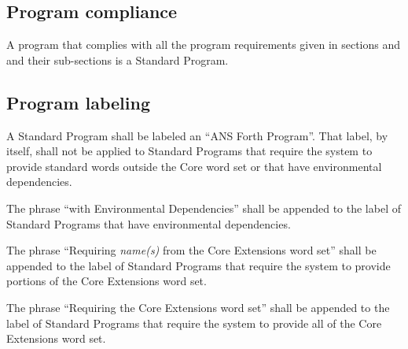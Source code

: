 \subsection{Program compliance} %

A program that complies with all the program requirements given in
sections  and
 and their sub-sections is
a Standard Program.

\subsection{Program labeling} %

A Standard Program shall be labeled an ``ANS Forth Program''. That
label, by itself, shall not be applied to Standard Programs that
require the system to provide standard words outside the Core word
set or that have environmental dependencies.

The phrase ``with Environmental Dependencies'' shall be appended to
the label of Standard Programs that have environmental dependencies.

The phrase ``Requiring \emph{name(s)} from the Core Extensions word
set'' shall be appended to the label of Standard Programs that
require the system to provide portions of the Core Extensions word
set.

The phrase ``Requiring the Core Extensions word set'' shall be
appended to the label of Standard Programs that require the system
to provide all of the Core Extensions word set.
